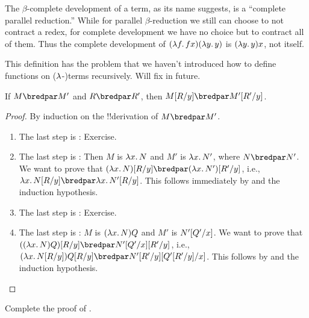 \documentclass[../../../include/open-logic-section]{subfiles}
\begin{document}
The $\beta$-complete development of a term, as its name suggests, is a
``complete parallel reduction.'' While for parallel $\beta$-reduction we still
can choose to not contract a redex, for complete development we have
no choice but to contract all of them. Thus the complete development
of $(\lambd[f][fx])(\lambd[y][y])$ is $(\lambd[y][y])x$, not itself.

\begin{editorial}
  This definition has the problem that we haven't introduced how to
  define functions on ($\lambd$-)terms recursively. Will fix in future.
\end{editorial}

\begin{lem}
  If $M \bredpar M'$ and $R \bredpar R'$, then $\Subst{M}{R}{y}
  \bredpar \Subst{M'}{R'}{y}$.
\end{lem}

\begin{proof}
  By induction on the !!{derivation} of $M \bredpar M'$.
  \begin{enumerate}
    \item The last step is : Exercise.
    \item The last step is : Then $M$ is 
      $\lambd[x][N]$ and $M'$ is $\lambd[x][N']$,
      where $N \bredpar N'$. We want to prove that
      $\Subst{(\lambd[x][N])}{R}{y} \bredpar
      \Subst{(\lambd[x][N'])}{R'}{y}$, i.e.,
      $\lambd[x][\Subst{N}{R}{y}] \bredpar
      \lambd[x][\Subst{N'}{R}{y}]$. This follows immediately by
       and the induction hypothesis.
    \item The last step is : Exercise.
    \item The last step is : $M$ is
      $(\lambd[x][N])Q$ and $M'$ is $N'[Q'/x]$. We want to
      prove that $\Subst{((\lambd[x][N])Q)}{R}{y} \bredpar
      \Subst{\Subst{N'}{Q'}{x}}{R'}{y}$, i.e.,
      $(\lambd[x][\Subst{N}{R}{y}])\Subst{Q}{R}{y} \bredpar
      \Subst{\Subst{N'}{R'}{y}}{\Subst{Q'}{R'}{y}}{x}$. This follows
      by  and the induction hypothesis.
  \end{enumerate}
\end{proof}

\begin{prob}
  Complete the proof of .
\end{prob}
\end{document}
